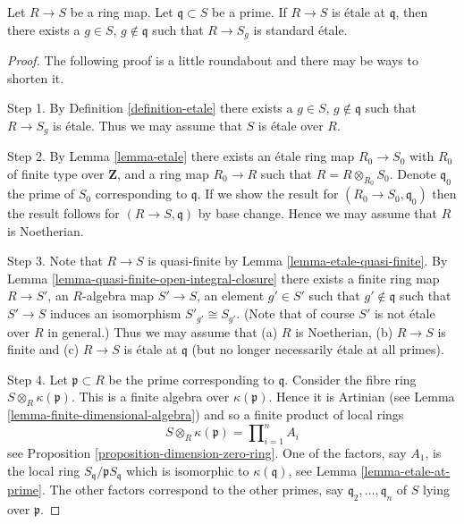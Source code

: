 \begin{proposition}
\label{proposition-etale-locally-standard}
Let $R \to S$ be a ring map. Let $\mathfrak q \subset S$ be a prime.
If $R \to S$ is \'etale at $\mathfrak q$, then there exists
a $g \in S$, $g \not \in \mathfrak q$ such that $R \to S_g$
is standard \'etale.
\end{proposition}

\begin{proof}
The following proof is a little roundabout and there may be ways to
shorten it.

\medskip\noindent
Step 1. By Definition \ref{definition-etale}
there exists a $g \in S$, $g \not \in \mathfrak q$
such that $R \to S_g$ is \'etale. Thus we may assume that $S$ is \'etale
over $R$.

\medskip\noindent
Step 2. By Lemma \ref{lemma-etale} there exists an \'etale ring map
$R_0 \to S_0$ with $R_0$ of finite type over $\mathbf{Z}$, and a ring map
$R_0 \to R$ such that $R = R \otimes_{R_0} S_0$. Denote
$\mathfrak q_0$ the prime of $S_0$ corresponding to $\mathfrak q$.
If we show the result for $(R_0 \to S_0, \mathfrak q_0)$ then the
result follows for $(R \to S, \mathfrak q)$ by base change. Hence
we may assume that $R$ is Noetherian.

\medskip\noindent
Step 3.
Note that $R \to S$ is quasi-finite by Lemma \ref{lemma-etale-quasi-finite}.
By Lemma \ref{lemma-quasi-finite-open-integral-closure}
there exists a finite ring map $R \to S'$, an $R$-algebra map
$S' \to S$, an element $g' \in S'$ such that
$g' \not \in \mathfrak q$ such that $S' \to S$ induces
an isomorphism $S'_{g'} \cong S_{g'}$.
(Note that of course $S'$ is not \'etale over $R$ in general.)
Thus we may assume that (a) $R$ is Noetherian, (b) $R \to S$ is finite
and (c) $R \to S$ is \'etale at $\mathfrak q$
(but no longer necessarily \'etale at all primes).

\medskip\noindent
Step 4. Let $\mathfrak p \subset R$ be the prime corresponding
to $\mathfrak q$. Consider the fibre ring
$S \otimes_R \kappa(\mathfrak p)$. This is a finite algebra over
$\kappa(\mathfrak p)$. Hence it is Artinian
(see Lemma \ref{lemma-finite-dimensional-algebra}) and
so a finite product of local rings
$$
S \otimes_R \kappa(\mathfrak p) = \prod\nolimits_{i = 1}^n A_i
$$
see Proposition \ref{proposition-dimension-zero-ring}. One of the factors,
say $A_1$, is the local ring $S_{\mathfrak q}/\mathfrak pS_{\mathfrak q}$
which is isomorphic to $\kappa(\mathfrak q)$,
see Lemma \ref{lemma-etale-at-prime}. The other factors correspond to
the other primes, say $\mathfrak q_2, \ldots, \mathfrak q_n$ of
$S$ lying over $\mathfrak p$.


\end{proof}
